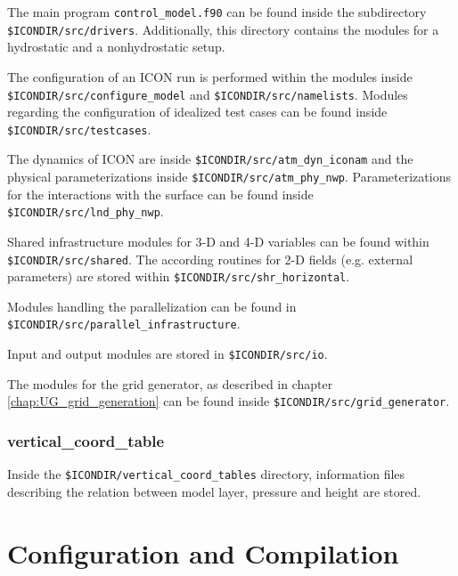 The main program \verb+control_model.f90+ can be found inside the subdirectory \newline \verb+$ICONDIR/src/drivers+. Additionally, this directory contains the modules for a hydrostatic and a nonhydrostatic setup.

The configuration of an ICON run is performed within the modules inside \newline \verb+$ICONDIR/src/configure_model+ and \verb+$ICONDIR/src/namelists+. Modules regarding the configuration of idealized test cases can be found inside \verb+$ICONDIR/src/testcases+.

The dynamics of ICON are inside \verb+$ICONDIR/src/atm_dyn_iconam+ and the physical parameterizations inside \verb+$ICONDIR/src/atm_phy_nwp+. Parameterizations for the interactions with the surface can be found inside \verb+$ICONDIR/src/lnd_phy_nwp+.

Shared infrastructure modules for 3-D and 4-D variables can be found within \newline \verb+$ICONDIR/src/shared+. The according routines for 2-D fields (e.g. external parameters) are stored within \verb+$ICONDIR/src/shr_horizontal+.

Modules handling the parallelization can be found in \newline\verb+$ICONDIR/src/parallel_infrastructure+.

Input and output modules are stored in \verb+$ICONDIR/src/io+.

The modules for the grid generator, as described in chapter \ref{chap:UG_grid_generation} can be found inside \newline \verb+$ICONDIR/src/grid_generator+.

\subsubsection{vertical\_coord\_table}

Inside the \verb+$ICONDIR/vertical_coord_tables+ directory, information files describing the relation between model layer, pressure and height are stored.

\section{Configuration and Compilation}
\label{chap:UG_config_compil}


